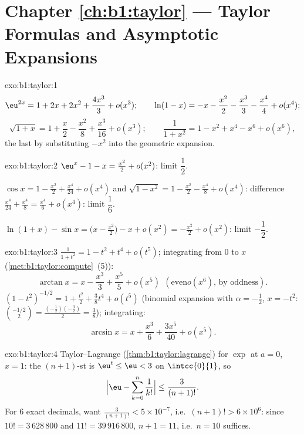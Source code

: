 \section*{Chapter \ref{ch:b1:taylor} --- Taylor Formulas and Asymptotic
Expansions}

\begin{solution}{exo:b1:taylor:1}
\[
\eu^{2x} = 1 + 2x + 2x^2 + \frac{4x^3}{3} + o(x^3);
\qquad
\ln(1 - x) = -x - \frac{x^2}{2} - \frac{x^3}{3} - \frac{x^4}{4} +
o(x^4);
\]
\[
\sqrt{1+x} = 1 + \frac x2 - \frac{x^2}{8} + \frac{x^3}{16} + o(x^3);
\qquad
\frac{1}{1 + x^2} = 1 - x^2 + x^4 - x^6 + o(x^6),
\]
the last by substituting $-x^2$ into the geometric expansion.
\end{solution}

\begin{solution}{exo:b1:taylor:2}
$\eu^x - 1 - x = \frac{x^2}{2} + o(x^2)$: limit $\dfrac12$.

$\cos x = 1 - \frac{x^2}{2} + \frac{x^4}{24} + o(x^4)$ and
$\sqrt{1 - x^2} = 1 - \frac{x^2}{2} - \frac{x^4}{8} + o(x^4)$:
difference $\frac{x^4}{24} + \frac{x^4}{8} = \frac{x^4}{6} + o(x^4)$:
limit $\dfrac16$.

$\ln(1+x) - \sin x = \bigl(x - \frac{x^2}{2}\bigr) - x + o(x^2) =
-\frac{x^2}{2} + o(x^2)$: limit $-\dfrac12$.
\end{solution}

\begin{solution}{exo:b1:taylor:3}
$\frac{1}{1+t^2} = 1 - t^2 + t^4 + o(t^5)$; integrating from $0$ to
$x$ (\cref{met:b1:taylor:compute}~(5)):
\[
\arctan x = x - \frac{x^3}{3} + \frac{x^5}{5} + o(x^5)\ \ (\text{even
}o(x^6)\text{, by oddness}).
\]
$(1 - t^2)^{-1/2} = 1 + \frac{t^2}{2} + \frac38 t^4 + o(t^5)$ (binomial
expansion with $\alpha = -\frac12$, $x = -t^2$:
$\binom{-1/2}{2} = \frac{(-\frac12)(-\frac32)}{2} = \frac38$);
integrating:
\[
\arcsin x = x + \frac{x^3}{6} + \frac{3x^5}{40} + o(x^5) .
\]
\end{solution}

\begin{solution}{exo:b1:taylor:4}
Taylor--Lagrange (\cref{thm:b1:taylor:lagrange}) for $\exp$ at $a =
0$, $x = 1$: the $(n+1)$-st  is $\eu^t \leq \eu < 3$ on
$\intcc{0}{1}$, so
\[
\Bigl|\eu - \sum_{k=0}^{n} \frac{1}{k!}\Bigr| \leq
\frac{3}{(n+1)!} .
\]
For $6$ exact decimals, want $\frac{3}{(n+1)!} < 5\times 10^{-7}$,
i.e.\ $(n+1)! > 6\times 10^{6}$: since $10! = 3\,628\,800$ and $11! =
39\,916\,800$, $n + 1 = 11$, i.e.\ $n = 10$ suffices.
\end{solution}

